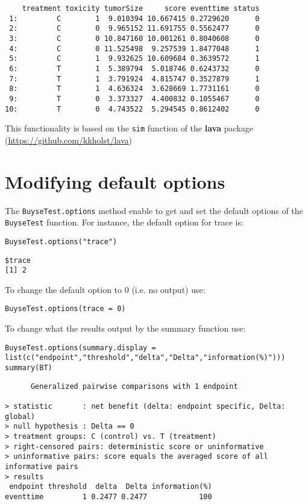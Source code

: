 \documentclass[12pt]{article}
\begin{document}
\begin{verbatim}
    treatment toxicity tumorSize     score eventtime status
 1:         C        1  9.010394 10.667415 0.2729620      0
 2:         C        0  9.965152 11.691755 0.5562477      0
 3:         C        0 10.847160 10.001261 0.8040608      0
 4:         C        0 11.525498  9.257539 1.8477048      1
 5:         C        1  9.932625 10.609684 0.3639572      1
 6:         T        1  5.389794  5.018746 0.6243732      0
 7:         T        1  3.791924  4.815747 0.3527879      1
 8:         T        1  4.636324  3.628669 1.7731161      0
 9:         T        0  3.373327  4.400832 0.1055467      0
10:         T        0  4.743522  5.294545 0.8612402      0
\end{verbatim}

This functionality is based on the \texttt{sim} function of the \textbf{lava}
package (\url{https://github.com/kkholst/lava})

\clearpage

\section{Modifying default options}
\label{sec:org949b46e}
The \texttt{BuyseTest.options} method enable to get and set the default
options of the \texttt{BuyseTest} function. For instance, the default option
for trace is:
\lstset{language=r,label= ,caption= ,captionpos=b,numbers=none}
\begin{lstlisting}
BuyseTest.options("trace")
\end{lstlisting}

\begin{verbatim}
$trace
[1] 2
\end{verbatim}

To change the default option to 0 (i.e. no output) use:
\lstset{language=r,label= ,caption= ,captionpos=b,numbers=none}
\begin{lstlisting}
BuyseTest.options(trace = 0)
\end{lstlisting}

To change what the results output by the summary function use:
\lstset{language=r,label= ,caption= ,captionpos=b,numbers=none}
\begin{lstlisting}
BuyseTest.options(summary.display = list(c("endpoint","threshold","delta","Delta","information(%)")))
summary(BT)
\end{lstlisting}

\begin{verbatim}
      Generalized pairwise comparisons with 1 endpoint

> statistic       : net benefit (delta: endpoint specific, Delta: global) 
> null hypothesis : Delta == 0 
> treatment groups: C (control) vs. T (treatment) 
> right-censored pairs: deterministic score or uninformative
> uninformative pairs: score equals the averaged score of all informative pairs
> results
 endpoint threshold  delta  Delta information(%)
eventtime         1 0.2477 0.2477            100
\end{verbatim}
\end{document}
